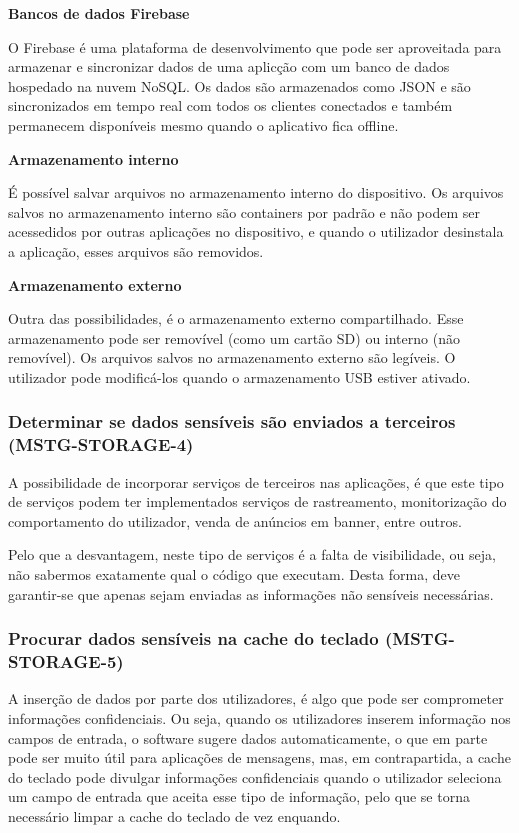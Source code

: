 \documentclass{article}
\begin{document}
\textbf{Bancos de dados Firebase}
\par O Firebase é uma plataforma de desenvolvimento que pode ser aproveitada para armazenar e sincronizar dados de uma aplicção com um banco de dados hospedado na nuvem NoSQL. Os dados são armazenados como JSON e são sincronizados em tempo real com todos os clientes conectados e também permanecem disponíveis mesmo quando o aplicativo fica offline.
\\
\par \textbf{Armazenamento interno}
\par É possível salvar arquivos no armazenamento interno do dispositivo. Os arquivos salvos no armazenamento interno são containers por padrão e não podem ser acessedidos por outras aplicações no dispositivo, e quando o utilizador desinstala a aplicação, esses arquivos são removidos.
\\
\par \textbf{Armazenamento externo}
\par Outra das possibilidades, é o armazenamento externo compartilhado. Esse armazenamento pode ser removível (como um cartão SD) ou interno (não removível). Os arquivos salvos no armazenamento externo são legíveis. O utilizador pode modificá-los quando o armazenamento USB estiver ativado.



\subsubsection{Determinar se dados sensíveis são enviados a terceiros (MSTG-STORAGE-4)}
\par A possibilidade de incorporar serviços de terceiros nas aplicações, é que este tipo de serviços podem ter implementados serviços de rastreamento, monitorização do comportamento do utilizador, venda de anúncios em banner, entre outros.
\par Pelo que a desvantagem, neste tipo de serviços é a falta de visibilidade, ou seja, não sabermos exatamente qual o código que executam. Desta forma, deve garantir-se que apenas sejam enviadas as informações não sensíveis necessárias.


\subsubsection{Procurar dados sensíveis na cache do teclado (MSTG-STORAGE-5)}
\par A inserção de dados por parte dos utilizadores, é algo que pode ser comprometer informações confidenciais. Ou seja, quando os utilizadores inserem informação nos campos de entrada, o software sugere dados automaticamente, o que em parte pode ser muito útil para aplicações de mensagens, mas, em contrapartida, a cache do teclado pode divulgar informações confidenciais quando o utilizador seleciona um campo de entrada que aceita esse tipo de informação, pelo que se torna necessário limpar a cache do teclado de vez enquando.
\end{document}
